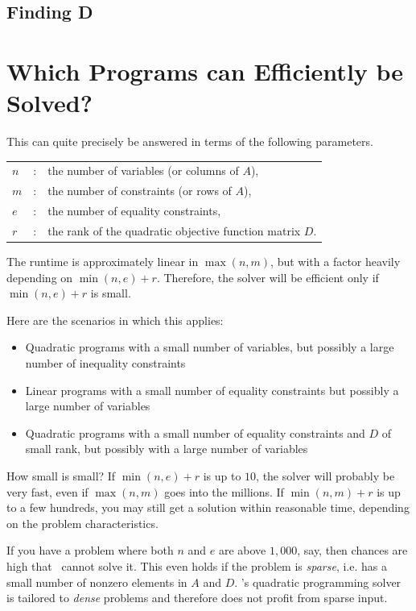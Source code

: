 
\subsection{Finding D }

\section{Which Programs can Efficiently be Solved?}
\label{sec:QP-efficiency}
This can quite precisely be answered in terms of the following
parameters.
\begin{tabular}{lcl}
$n$ &: & the number of variables (or columns of $A$),\\
$m$ &: &the number of constraints (or rows of $A$),\\
$e$ &: &the number of equality constraints,\\
$r$ &: &the rank of the quadratic objective function matrix $D$.
\end{tabular}
The runtime is approximately linear in $\max(n,m)$, 
but with a factor heavily depending on $\min(n,e)+r$.
Therefore, the solver will be efficient only if $\min(n,e)+r$ is small.

Here are the scenarios in which this applies:
\begin{itemize}
\item Quadratic programs with a small number of variables, but
  possibly a large number of inequality constraints
\item Linear programs with a small number of equality constraints but
  possibly a large number of variables
\item Quadratic programs with a small number of equality constraints and
  $D$ of small rank, but possibly with a large number of variables
\end{itemize} 

How small is small? If $\min(n,e)+r$ is up to $10$, the solver will
probably be very fast, even if $\max(n,m)$ goes into the millions. 
If $\min(n,m)+r$ is up to a few hundreds, you may still get a solution 
within reasonable time, depending on the problem characteristics.

If you have a problem where both $n$ and $e$ are above
$1,000$, say, then chances are high that \cgal\ cannot solve it.
This even holds if the problem is \emph{sparse}, i.e. has a small
number of nonzero elements in $A$ and $D$. \cgal's quadratic programming
solver is tailored to \emph{dense} problems and therefore does not 
profit from sparse input.


